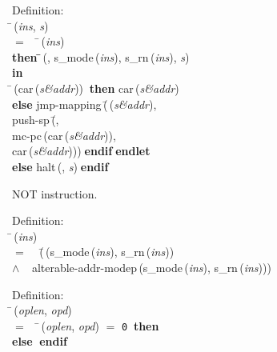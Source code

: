 \begin{tabbing}{\sc Definition}: \\  
\=\,({\it{ins\/}}, {\it{s\/}}) \\ 
$=$$\;\;\;\;$\=\,({\it{ins\/}}) \\ 
{\bf then }\=\=\,({}, {\rm{s\_mode}}\,({\it{ins\/}}), {\rm{s\_rn}}\,({\it{ins\/}}), {\it{s\/}})\- \\ 
{\bf in} \\ 
\=\,({\rm{car}}\,({\it{s\&addr\/}}))$\;\;${\bf then }{\rm{car}}\,({\it{s\&addr\/}}) \\ 
{\bf else }{\rm{jmp-mapping}}\,(\=\,({\it{s\&addr\/}}), \\ 
{\rm{push-sp}}\,(\=, \\ 
{\rm{mc-pc}}\,({\rm{car}}\,({\it{s\&addr\/}})), \\ 
{\rm{car}}\,({\it{s\&addr\/}}))\-)\-$\;${\bf  endif}\-$\;${\bf  endlet}\- \\ 
{\bf else }{\rm{halt}}\,({}, {\it{s\/}})$\;${\bf  endif}\-\-
\end{tabbing}

 NOT instruction.
\begin{tabbing}{\sc Definition}: \\  
\=\,({\it{ins\/}}) \\ 
$=$$\;\;\;\;$(\=\,({\rm{s\_mode}}\,({\it{ins\/}}), {\rm{s\_rn}}\,({\it{ins\/}})) \\ 
$\wedge$$\;\;\;\;${\rm{alterable-addr-modep}}\,({\rm{s\_mode}}\,({\it{ins\/}}), {\rm{s\_rn}}\,({\it{ins\/}})))\-\-
\end{tabbing}

\begin{tabbing}{\sc Definition}: \\  
\=\,({\it{oplen\/}}, {\it{opd\/}}) \\ 
$=$$\;\;\;\;$\=\,({\it{oplen\/}}, {\it{opd\/}}) $=$ {\tt{0}}$\;\;${\bf then }{} \\ 
{\bf else }{}$\;${\bf  endif}\-\-
\end{tabbing}

